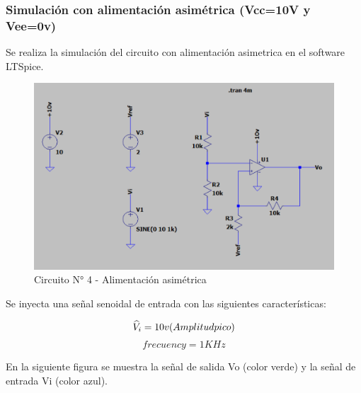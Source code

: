 \subsubsection{Simulación con alimentación asimétrica (Vcc=10V y Vee=0v)}

Se realiza la simulación del circuito con alimentación asimetrica en el software LTSpice.

\begin{figure}[h!]
    \centering
    \includegraphics[width=0.75\linewidth]{Secciones/Circuito4/Circuito 4 - Alimentación asimétrica.png}
    \caption{Circuito N° 4 - Alimentación asimétrica}
    \label{fig:AlimentacionAsimetrica}
\end{figure}

Se inyecta una señal senoidal de entrada con las siguientes características:

\[{\widehat{V}}_i= 10v \space (Amplitud \space pico)\]
\[frecuency= 1KHz\]

 En la siguiente figura se muestra la señal de salida Vo (color verde)  y la señal de entrada Vi (color azul).
 
